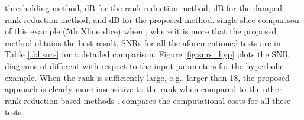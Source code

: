 thresholding method,  dB for the rank-reduction method,  dB for the damped rank-reduction method, and  dB for the proposed method.   single slice comparison of this example (5th Xline slice) when , where it is more  that the proposed method obtains the best result.   SNRs for all the aforementioned tests are  in Table \ref{tbl:snrs} for a detailed comparison. %
Figure \ref{fig:snrs_hyp} plots the SNR diagrams of  different  with respect to the input parameters for the hyperbolic example. When the rank is sufficiently large, e.g., larger than 18, the proposed approach is clearly more insensitive to the rank when compared to the other rank-reduction based methods .  compares the computational costs for all these tests. 




